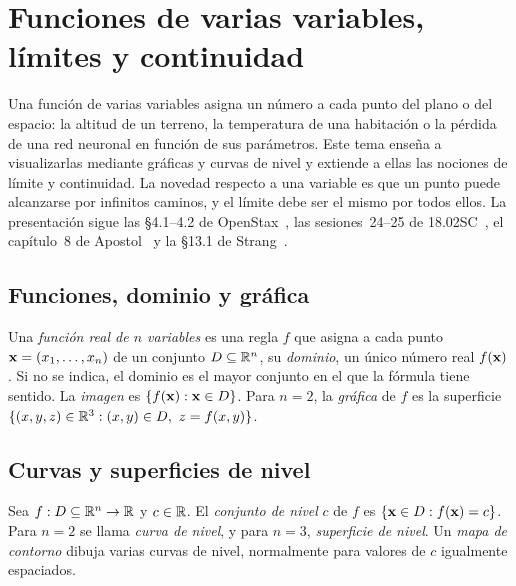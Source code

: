 \chapter{Funciones de varias variables, límites y continuidad}
\label{tema:3}

Una función de varias variables asigna un número a cada punto del plano o del espacio: la altitud de un terreno, la temperatura de una habitación o la pérdida de una red neuronal en función de sus parámetros. Este tema enseña a visualizarlas mediante gráficas y curvas de nivel y extiende a ellas las nociones de límite y continuidad. La novedad respecto a una variable es que un punto puede alcanzarse por infinitos caminos, y el límite debe ser el mismo por todos ellos. La presentación sigue las §4.1--4.2 de OpenStax~\cite{openstax3}, las sesiones~24--25 de 18.02SC~\cite{mit1802}, el capítulo~8 de Apostol~\cite{apostol2} y la §13.1 de Strang~\cite{strangcalc}.

\section{Funciones, dominio y gráfica}

\begin{definicion}\label{def:funcion-n}
Una \emph{función real de $n$ variables} es una regla $f$ que asigna a cada punto $\mathbf{x}=(x_1,\dots,x_n)$ de un conjunto $D\subseteq\mathbb{R}^n$, su \emph{dominio}, un único número real $f(\mathbf{x})$. Si no se indica, el dominio es el mayor conjunto en el que la fórmula tiene sentido. La \emph{imagen} es $\{f(\mathbf{x}):\mathbf{x}\in D\}$. Para $n=2$, la \emph{gráfica} de $f$ es la superficie $\{(x,y,z)\in\mathbb{R}^3: (x,y)\in D,\ z=f(x,y)\}$.
\end{definicion}

\addtocounter{definicion}{1}%

\section{Curvas y superficies de nivel}

\begin{definicion}\label{def:nivel}
Sea $f:D\subseteq\mathbb{R}^n\to\mathbb{R}$ y $c\in\mathbb{R}$. El \emph{conjunto de nivel} $c$ de $f$ es $\{\mathbf{x}\in D: f(\mathbf{x})=c\}$. Para $n=2$ se llama \emph{curva de nivel}, y para $n=3$, \emph{superficie de nivel}. Un \emph{mapa de contorno} dibuja varias curvas de nivel, normalmente para valores de $c$ igualmente espaciados.
\end{definicion}

